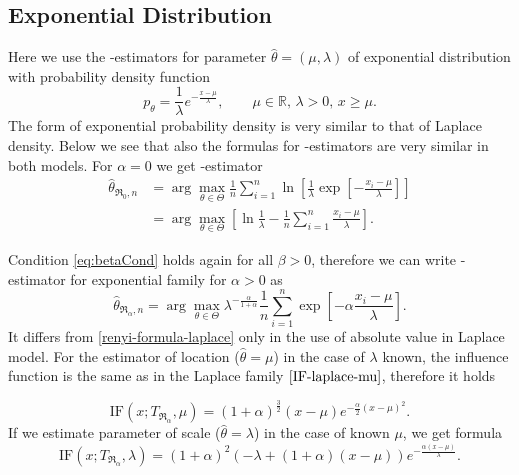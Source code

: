 \subsection{Exponential Distribution} 
Here we use the \mRa-estimators for parameter $\hat{\theta} = (\mu,\lambda)$ of exponential distribution with probability density function 
\begin{equation}
	p_\theta = \frac{1}{\lambda} e^{-\frac{x-\mu}{\lambda}}, \qquad \mu\in \mathbb{R},\, \lambda>0, \, x\geq\mu.
\end{equation}
\noindent The form of exponential probability density is very similar to that of Laplace density. Below we see that also the formulas for \mRa-estimators are very similar in both models. For $\alpha = 0$ we get \mRa-estimator
\begin{align}
	\hat{\theta}_{\mathfrak{R}_0,n} & =  \arg \max_{\theta \in \Theta} \frac{1}{n} \sum^n_{i=1} \ln \left[ \frac{1}{\lambda}\exp \left[-\frac{x_i-\mu}{\lambda} \right] \right] \nonumber \\
	& =  \arg \max_{\theta \in \Theta} \left[ \ln \frac{1}{\lambda} - \frac{1}{n} \sum^n_{i=1} \frac{x_i-\mu}{\lambda} \right].
\end{align}

\noindent Condition \eqref{eq:betaCond} holds again for all  $\beta>0$, therefore we can write \mRa-estimator for exponential family for $\alpha>0$ as
\begin{equation}
	\hat{\theta}_{\mathfrak{R}_\alpha,n} = \arg \max_{\theta \in \Theta} \lambda^{-\frac{\alpha}{1+\alpha}} \frac{1}{n}\sum_{i=1}^n \exp \left[-\alpha\frac{x_i-\mu}{\lambda} \right].
	\label{renyi-formula-exponential}
\end{equation}
It differs from \eqref{renyi-formula-laplace} only in the use of absolute value in Laplace model. For  the estimator of location ($\hat{\theta} = \mu$) in the case of $\lambda$ known, the influence function is the same as in the Laplace family $\eqref{IF-laplace-mu}$, therefore it holds

\begin{equation}
	\mathrm{IF}(x;T_{\mathfrak{R}_\alpha},\mu) = (1+\alpha )^{\frac{3}{2}} (x-\mu )  e^{-\frac{\alpha}{2} (x-\mu )^2}. %
	\label{IF-exponential-mu}
\end{equation}
If we estimate parameter of scale ($\hat{\theta} = \lambda$) in the case of known $ \mu $, we get formula
\begin{equation}
	\mathrm{IF}(x;T_{\mathfrak{R}_\alpha},\lambda) =	(1+\alpha )^2 \left( - \lambda +(1+ \alpha)(x-\mu)\right) e^{-\frac{\alpha (x-\mu)}{\lambda }}. %
	\label{IF-exponential-lambda}
\end{equation}

